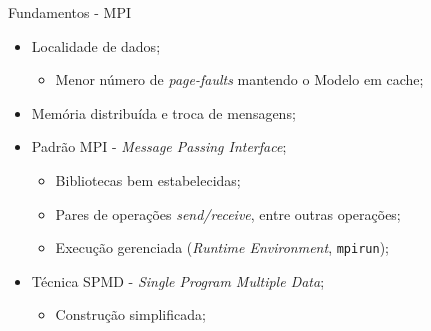 \documentclass[aspectratio=1610,10pt]{beamer}
\begin{document}
\begin{frame}[fragile]{Fundamentos - MPI}
  \begin{itemize}%
    \item Localidade de dados;
    \begin{itemize}
      \item Menor número de \emph{page-faults} mantendo o Modelo em cache;
    \end{itemize}
    \item Memória distribuída e troca de mensagens;
    \item Padrão MPI - \emph{Message Passing Interface};
    \begin{itemize}
      \item Bibliotecas bem estabelecidas;
      \item Pares de operações \emph{send/receive}, entre outras operações;
      \item Execução gerenciada (\emph{Runtime Environment}, \texttt{mpirun});
    \end{itemize}
    \item Técnica SPMD - \emph{Single Program Multiple Data};
    \begin{itemize}
      \item Construção simplificada;
    \end{itemize}
  \end{itemize}
\end{frame}
\end{document}
